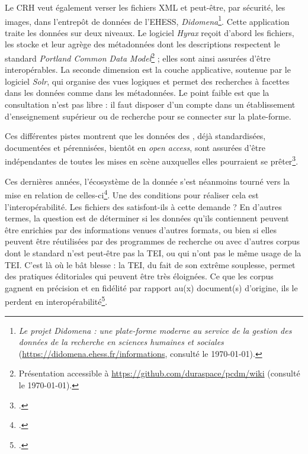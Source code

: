 Le CRH veut également verser les fichiers XML et peut-être, par sécurité, les images, dans l'entrepôt de données de l'EHESS, \textit{Didomena}\footnote{\textit{Le projet Didomena : une plate-forme moderne au service de la gestion des données de la recherche en sciences humaines et sociales} (\url{https://didomena.ehess.fr/informations}, consulté le \today).}. Cette application traite les données sur deux niveaux. Le logiciel \textit{Hyrax} reçoit d'abord les fichiers, les stocke et leur agrège des métadonnées dont les descriptions respectent le standard \textit{Portland Common Data Model}\footnote{Présentation accessible à \url{https://github.com/duraspace/pcdm/wiki} (consulté le \today).} ; elles sont ainsi assurées d'être interopérables. La seconde dimension est la couche applicative, soutenue par le logiciel \textit{Solr}, qui organise des vues logiques et permet des recherches à facettes dans les données comme dans les métadonnées. Le point faible est que la consultation n'est pas libre : il faut disposer d'un compte dans un établissement d'enseignement supérieur ou de recherche pour se connecter sur la plate-forme.

Ces différentes pistes montrent que les données des \odm, déjà standardisées, documentées et pérennisées, bientôt en \textit{open access}, sont assurées d'être indépendantes de toutes les mises en scène auxquelles elles pourraient se prêter\footcite[p. 63]{jolivet}.

Ces dernières années, l'écosystème de la donnée s'est néanmoins tourné vers la mise en relation de celles-ci\footcite[p. 66]{jolivet}. Une des conditions pour réaliser cela est l'interopérabilité. Les fichiers des \odm{} satisfont-ils à cette demande ? En d'autres termes, la question est de déterminer si les données qu'ils contiennent peuvent être enrichies par des informations venues d'autres formats, ou bien si elles peuvent être réutilisées par des programmes de recherche ou avec d'autres corpus dont le standard n'est peut-être pas la TEI, ou qui n'ont pas le même usage de la TEI. C'est là où le bât blesse : la TEI, du fait de son extrême souplesse, permet des pratiques éditoriales qui peuvent être très éloignées. Ce que les corpus gagnent en précision et en fidélité par rapport au(x) document(s) d'origine, ils le perdent en interopérabilité\footcite[p. 61-62]{jolivet}.